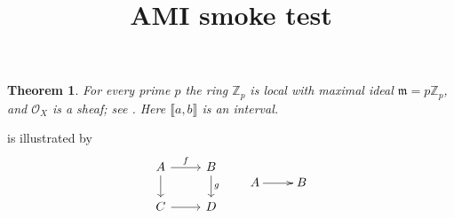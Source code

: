 \documentclass{amsart}
\title{AMI smoke test}
\newtheorem{theorem}{Theorem}
\begin{document}
\maketitle
\begin{theorem}\label{thm:main}
For every prime $p$ the ring $\mathbb{Z}_p$ is local with maximal ideal $\mathfrak{m} = p\mathbb{Z}_p$,
and $\mathscr{O}_X$ is a sheaf; see \cite{Serre}. Here $\llbracket a, b \rrbracket$ is an interval.
\end{theorem}
 is illustrated by
\[
\begin{tikzcd}
A \arrow[r, "f"] \arrow[d] & B \arrow[d, "g"] \\
C \arrow[r] & D
\end{tikzcd}
\qquad
\xymatrix{ A \ar[r] & B }
\]
\printbibliography
\end{document}
